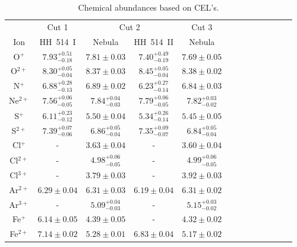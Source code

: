 \documentclass[fleqn,usenatbib]{mnras}
\begin{document}
\begin{table}
\centering
\caption{Chemical abundances based on CEL's.}
\label{tab:cels_abundances}
\begin{tabular}{ccccccccccccc}
\hline
 & \multicolumn{1}{c}{Cut 1} & \multicolumn{2}{c}{Cut 2} & \multicolumn{1}{c}{Cut 3} & \\
Ion &  HH~514~I & Nebula & HH~514~II  & Nebula \\
\hline

O$^{+}$ & $7.93^{+0.51} _{-0.18}$ & $7.81 \pm 0.03 $&$7.40^{+0.49} _{-0.19}$ & $7.69 \pm 0.05 $\\ 

O$^{2+}$ & $8.30^{+0.05} _{-0.04}$& $8.37 \pm 0.03$& $8.45^{+0.05} _{-0.04}$ &$8.38 \pm 0.02 $\\

N$^{+}$  & $6.88^{+0.28} _{-0.13}$ &$6.89 \pm 0.02 $  & $6.23^{+0.27} _{-0.14}$& $6.84 \pm 0.03 $\\

Ne$^{2+}$ & $7.56^{+0.06} _{-0.05}$& $7.84^{+0.04} _{-0.03}$ & $7.79^{+0.06} _{-0.05}$&$7.82^{+0.03} _{-0.02}$\\

S$^{+}$ & $6.11^{+0.23} _{-0.12}$ & $5.50 \pm 0.04 $& $5.34^{+0.26} _{-0.14}$&$5.45 \pm 0.05 $\\

S$^{2+}$ & $7.39^{+0.07} _{-0.06}$ &$6.86^{+0.05} _{-0.04}$ & $7.35^{+0.09} _{-0.07}$&$6.84^{+0.05} _{-0.04}$\\

Cl$^{+}$ & - &$3.63 \pm 0.04 $&- &$3.60 \pm 0.04 $\\

Cl$^{2+}$ &- &$4.98^{+0.06} _{-0.05}$&- &$4.99^{+0.06} _{-0.05}$\\

Cl$^{3+}$ & - &$3.79 \pm 0.03 $&- &$3.92 \pm 0.03 $\\

Ar$^{2+}$ & $6.29 \pm 0.04 $& $6.31 \pm 0.03 $& $6.19 \pm 0.04 $&$6.31 \pm 0.02 $\\

Ar$^{3+}$ & - &$5.09^{+0.04} _{-0.03}$& -&$5.15^{+0.03} _{-0.02}$\\

Fe$^{+}$ & $6.14 \pm 0.05$ & $4.39 \pm 0.05$ & - &$4.32 \pm 0.02$\\ 

Fe$^{2+}$ & $7.14 \pm 0.02$ & $5.28 \pm 0.01$& $6.83 \pm 0.04$&$5.17 \pm 0.02$\\


\end{tabular}
\end{table}
\end{document}

